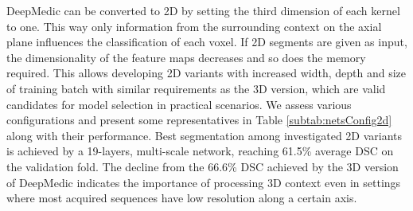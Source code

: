 DeepMedic can be converted to 2D by setting the third dimension of each kernel to one. This way only information from the surrounding context on the axial plane influences the classification of each voxel. If 2D segments are given as input, the dimensionality of the feature maps decreases and so does the memory required. This allows developing 2D variants with increased width, depth and size of training batch with similar requirements as the 3D version, which are valid candidates for model selection in practical scenarios. We assess various configurations and present some representatives in Table \ref{subtab:netsConfig2d} along with their performance. Best segmentation among investigated 2D variants is achieved by a 19-layers, multi-scale network, reaching 61.5\% average DSC on the validation fold. The decline from the 66.6\% DSC achieved by the 3D version of DeepMedic indicates the importance of processing 3D context even in settings where most acquired sequences have low resolution along a certain axis.
